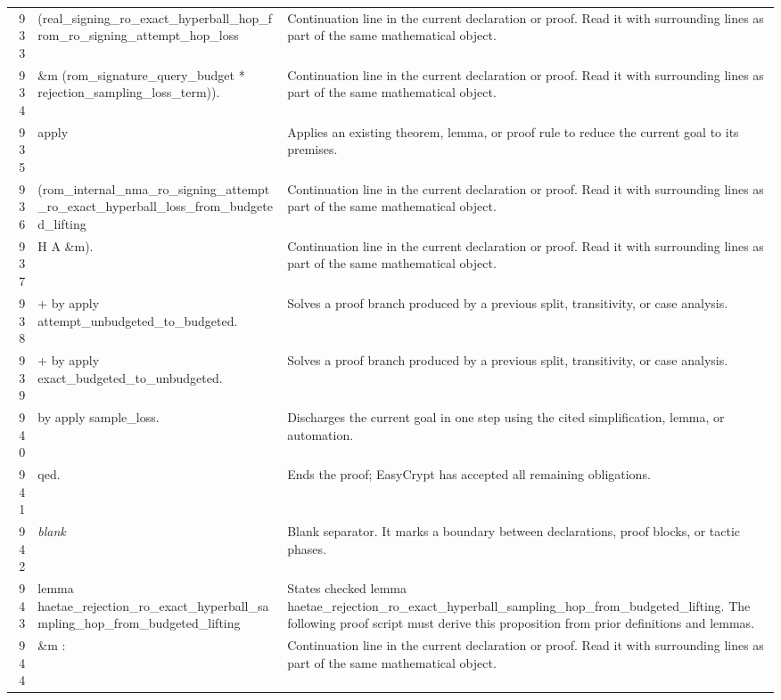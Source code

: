 \documentclass[10pt]{article}
\begin{document}
\begin{longtable}{r L{0.53\textwidth} L{0.37\textwidth}}
933 & {\ttfamily\scriptsize   (real\_signing\_ro\_exact\_hyperball\_hop\_from\_ro\_signing\_attempt\_hop\_loss} & Continuation line in the current declaration or proof.  Read it with surrounding lines as part of the same mathematical object. \\
934 & {\ttfamily\scriptsize      \&m (rom\_signature\_query\_budget * rejection\_sampling\_loss\_term)).} & Continuation line in the current declaration or proof.  Read it with surrounding lines as part of the same mathematical object. \\
935 & {\ttfamily\scriptsize apply} & Applies an existing theorem, lemma, or proof rule to reduce the current goal to its premises. \\
936 & {\ttfamily\scriptsize   (rom\_internal\_nma\_ro\_signing\_attempt\_ro\_exact\_hyperball\_loss\_from\_budgeted\_lifting} & Continuation line in the current declaration or proof.  Read it with surrounding lines as part of the same mathematical object. \\
937 & {\ttfamily\scriptsize      H A \&m).} & Continuation line in the current declaration or proof.  Read it with surrounding lines as part of the same mathematical object. \\
938 & {\ttfamily\scriptsize + by apply attempt\_unbudgeted\_to\_budgeted.} & Solves a proof branch produced by a previous split, transitivity, or case analysis. \\
939 & {\ttfamily\scriptsize + by apply exact\_budgeted\_to\_unbudgeted.} & Solves a proof branch produced by a previous split, transitivity, or case analysis. \\
940 & {\ttfamily\scriptsize by apply sample\_loss.} & Discharges the current goal in one step using the cited simplification, lemma, or automation. \\
941 & {\ttfamily\scriptsize qed.} & Ends the proof; EasyCrypt has accepted all remaining obligations. \\
942 & {\ttfamily\scriptsize \emph{blank}} & Blank separator.  It marks a boundary between declarations, proof blocks, or tactic phases. \\
943 & {\ttfamily\scriptsize lemma haetae\_rejection\_ro\_exact\_hyperball\_sampling\_hop\_from\_budgeted\_lifting} & States checked lemma haetae\_rejection\_ro\_exact\_hyperball\_sampling\_hop\_from\_budgeted\_lifting.  The following proof script must derive this proposition from prior definitions and lemmas. \\
944 & {\ttfamily\scriptsize   \&m :} & Continuation line in the current declaration or proof.  Read it with surrounding lines as part of the same mathematical object. \\

\end{longtable}
\end{document}

